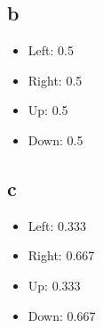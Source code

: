 \documentclass{article}
\begin{document}
    \subsection{b}
    \begin{itemize}
        \item Left: 0.5
        \item Right: 0.5
        \item Up: 0.5
        \item Down: 0.5
    \end{itemize}
    \subsection{c}
    \begin{itemize}
        \item Left: 0.333
        \item Right: 0.667
        \item Up: 0.333
        \item Down: 0.667
    \end{itemize}
\end{document}
